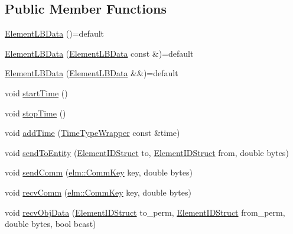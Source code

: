 \subsection*{Public Member Functions}
\begin{DoxyCompactItemize}
\item 
\hyperlink{structvt_1_1elm_1_1_element_l_b_data_aa7a5f68f276e0d3ae1279bb0f3050e4d}{Element\+L\+B\+Data} ()=default
\item 
\hyperlink{structvt_1_1elm_1_1_element_l_b_data_a2aa0d177c123d04ac24342b9558f3c46}{Element\+L\+B\+Data} (\hyperlink{structvt_1_1elm_1_1_element_l_b_data}{Element\+L\+B\+Data} const \&)=default
\item 
\hyperlink{structvt_1_1elm_1_1_element_l_b_data_a8ab77d61c0c9351e21329445e7a7b844}{Element\+L\+B\+Data} (\hyperlink{structvt_1_1elm_1_1_element_l_b_data}{Element\+L\+B\+Data} \&\&)=default
\item 
void \hyperlink{structvt_1_1elm_1_1_element_l_b_data_a6827a4e9d889e2b3fd8ca7b402ebda0b}{start\+Time} ()
\item 
void \hyperlink{structvt_1_1elm_1_1_element_l_b_data_a5558d58d3e3c1d0138cceda8a3d48e90}{stop\+Time} ()
\item 
void \hyperlink{structvt_1_1elm_1_1_element_l_b_data_a341e4d6ec3becd2b24ceab9be768f44c}{add\+Time} (\hyperlink{structvt_1_1_time_type_wrapper}{Time\+Type\+Wrapper} const \&time)
\item 
void \hyperlink{structvt_1_1elm_1_1_element_l_b_data_aa4d5faecce53f1ad3d4565a4e7b1cd10}{send\+To\+Entity} (\hyperlink{structvt_1_1elm_1_1_element_i_d_struct}{Element\+I\+D\+Struct} to, \hyperlink{structvt_1_1elm_1_1_element_i_d_struct}{Element\+I\+D\+Struct} from, double bytes)
\item 
void \hyperlink{structvt_1_1elm_1_1_element_l_b_data_ab7360fde34acf4dafafc8335617d8b6b}{send\+Comm} (\hyperlink{structvt_1_1elm_1_1_comm_key}{elm\+::\+Comm\+Key} key, double bytes)
\item 
void \hyperlink{structvt_1_1elm_1_1_element_l_b_data_af19f7cc95b8139b7aeec788e6450f28f}{recv\+Comm} (\hyperlink{structvt_1_1elm_1_1_comm_key}{elm\+::\+Comm\+Key} key, double bytes)
\item 
void \hyperlink{structvt_1_1elm_1_1_element_l_b_data_abe5161d28be7bccf79081ee9e8408ead}{recv\+Obj\+Data} (\hyperlink{structvt_1_1elm_1_1_element_i_d_struct}{Element\+I\+D\+Struct} to\+\_\+perm, \hyperlink{structvt_1_1elm_1_1_element_i_d_struct}{Element\+I\+D\+Struct} from\+\_\+perm, double bytes, bool bcast)
\item 

\end{DoxyCompactItemize}
